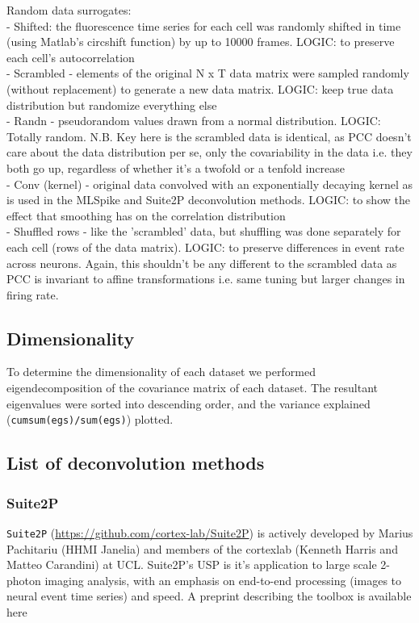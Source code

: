 \documentclass[a4paper,10pt,twocolumn]{article}
\begin{document}
Random data surrogates: \\ 
\indent - Shifted: the fluorescence time series for each cell was randomly shifted in time (using Matlab's circshift function) by up to 10000 frames. LOGIC: to preserve each cell's autocorrelation\\
\indent - Scrambled - elements of the original N x T data matrix were sampled randomly (without replacement) to generate a new data matrix. LOGIC: keep true data distribution but randomize everything else\\
\indent - Randn - pseudorandom values drawn from a normal distribution. LOGIC: Totally random. N.B. Key here is the scrambled data is identical, as PCC doesn't care about the data distribution per se, only the covariability in the data i.e. they both go up, regardless of whether it's a twofold or a tenfold increase\\
\indent - Conv (kernel) - original data convolved with an exponentially decaying kernel as is used in the MLSpike and Suite2P deconvolution methods. LOGIC: to show the effect that smoothing has on the correlation distribution \\
\indent - Shuffled rows - like the 'scrambled' data, but shuffling was done separately for each cell (rows of the data matrix). LOGIC: to preserve differences in event rate across neurons. Again, this shouldn't be any different to the scrambled data as PCC is invariant to affine transformations i.e. same tuning but larger changes in firing rate.\\


\subsection{Dimensionality}
To determine the dimensionality of each dataset we performed eigendecomposition of the covariance matrix of each dataset. The resultant eigenvalues were sorted into descending order, and the variance explained ({\tt cumsum(egs)/sum(egs)}) plotted.


\subsection*{List of deconvolution methods}
\subsubsection*{Suite2P}
\texttt{Suite2P} (\href{https://github.com/cortex-lab/Suite2P}{https://github.com/cortex-lab/Suite2P}) is actively developed by Marius Pachitariu (HHMI Janelia) and members of the cortexlab (Kenneth Harris and Matteo Carandini) at UCL. Suite2P's USP is it's application to large scale 2-photon imaging analysis, with an emphasis on end-to-end processing (images to neural event time series) and speed. A preprint describing the toolbox is available here \citep{Pachitariu_undated-ui} \\
\end{document}

